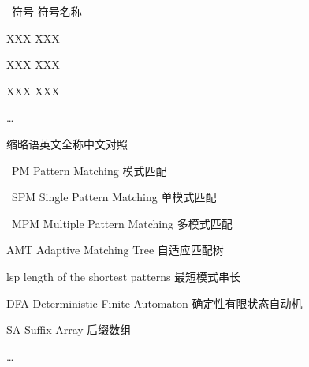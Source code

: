 \XDUpremainmatter

\begin{symbollist}
\item ~符号 \hspace{12em} 符号名称
\item XXX \hspace{12.5em} XXX
\item XXX \hspace{12.5em} XXX
\item XXX \hspace{12.5em} XXX
\item \ldots
\end{symbollist}

\begin{abbreviationlist}
\item 缩略语\hspace{6em}英文全称\hspace{6em}中文对照
\item ~PM \hspace{7em}Pattern Matching \hspace{7.5em} 模式匹配
\item ~SPM \hspace{7em} Single Pattern Matching \hspace{7.5em} 单模式匹配
\item ~MPM \hspace{7em} Multiple Pattern Matching \hspace{7.5em} 多模式匹配
\item AMT \hspace{7em} Adaptive Matching Tree  \hspace{7.5em} 自适应匹配树
\item lsp \hspace{7em} length of the shortest patterns  \hspace{7.5em} 最短模式串长
\item DFA \hspace{7em} Deterministic Finite Automaton  \hspace{7.5em} 确定性有限状态自动机
\item SA \hspace{7em} Suffix Array  \hspace{7.5em} 后缀数组

\item \ldots
\end{abbreviationlist}

